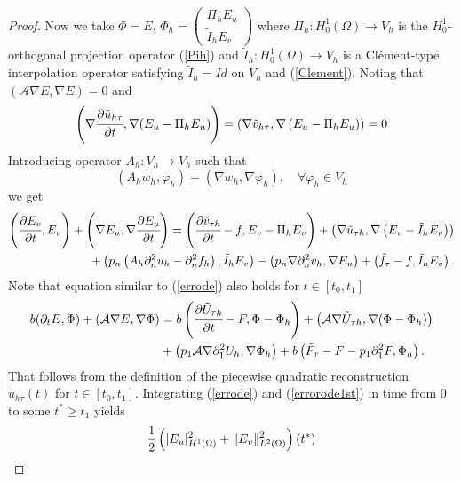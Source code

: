 \documentclass{imanum}
\begin{document}
\begin{proof}
Now we take $\Phi = E$, $\Phi_h = \begin{pmatrix}
  \Pi_h E_u\\
  \tilde I_h E_v
\end{pmatrix}$ where $\Pi_h : H^1_0 (\Omega) \to V_h$ is the
$H^1_0$-orthogonal projection operator (\ref{Pih}) and $\tilde I_h : H^1_0 (\Omega) \to V_h$ is a
Cl{\'e}ment-type interpolation operator satisfying $\tilde I_h=Id$ on $V_h$ and (\ref{Clement}). Noting that $( \mathcal{A} \nabla E,
\nabla E) = 0$ and
$$
\left( \nabla \cfrac{\partial \tilde{u}_{h\tau}}{\partial t}, \nabla ( E_u -
\Pi_h E_u)\right) = \left( \nabla \tilde{v}_{h\tau}, \nabla \left( E_u - \Pi_h E_u\right)\right) = 0
$$
Introducing operator $A_h:V_h\to V_h$ such that
\begin{equation}\label{Ah}
\left(A_h w_h, \varphi_h\right) =(\nabla w_h, \nabla\varphi_h),
\quad\forall\varphi_h\in V_h
\end{equation} 
we get
\begin{align*}
  \left(\cfrac{{\partial} E_{v}}{\partial t},E_{v}\right)+\left({\nabla} E_{u},{\nabla} \cfrac{{\partial} E_{u}}{\partial t}\right)=\left(\cfrac{{\partial}\tilde{v}_{{\tau} h}}{\partial t}-f,E_{v}-{\Pi}_{h} E_{v}\right)+\left({\nabla} \tilde{u}_{{\tau}h},{\nabla}\left(E_{v}-\tilde I_{h} E_{v}\right)\right)\\
  + \left(p_n \left(A_h {\partial}_{n}^{2} u_{h}-{\partial}_{n}^{2}f_h\right),\tilde I_{h} E_{v}\right)-\left(p_n {\nabla}{\partial}_{n}^{2} v_{h},{\nabla}E_{u}\right)
  +\left(\tilde{f}_\tau-f,\tilde I_{h} E_{v}\right).
\end{align*}
Note that equation similar to (\ref{errode}) also holds for $t \in [t_0, t_{1}]$
\begin{align} 
\label{errorode1st}{b}({\partial}_{t}E,{\Phi})+(\mathcal{A}{\nabla} E,{\nabla} {\Phi})
  &={b} \left(\cfrac{{\partial} \tilde{U}_{{\tau} h}}{\partial t}-F,{\Phi}-{\Phi}_{h}\right)+\left(\mathcal{A}{\nabla} \tilde{U}_{{\tau} h},{\nabla} ({\Phi}-{\Phi}_{h})\right)\\
\notag  &+\left(p_1 \mathcal{A}{\nabla} {\partial}_{1}^{2} U_{h},{\nabla} {\Phi}_{h}\right)
  + {b}\left( \tilde{F}_\tau -F - p_1 \partial^2_1 F, \Phi_h\right). 
\end{align}
That follows from the definition of the piecewise quadratic reconstruction $\tilde{u}_{h\tau} (t)$ for $t \in [t_0, t_{1}]$. Integrating (\ref{errode}) and (\ref{errorode1st}) in time from 0 to some $t^{\ast}\geq t_1$ yields
\begin{align}
  \notag  & {\frac{1}{2}} \left(|E_{u}|^{2}_{H^1(\Omega)}+\| E_{v}\|_{L^2(\Omega)}^{2}\right)(t^{{\ast}}) \\

\end{align}
\end{proof}
\end{document}
